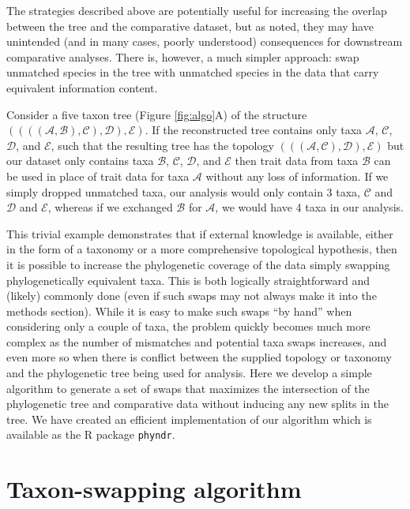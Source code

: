 \documentclass[a4paper,11pt]{article}
\newcommand{\phyndr}{\tt phyndr}
\begin{document}
The strategies described above are potentially useful for increasing the overlap between the tree and the comparative dataset, but as noted, they may have unintended (and in many cases, poorly understood) consequences for downstream comparative analyses. There is, however, a much simpler approach: swap unmatched species in the tree with unmatched species in the data that carry equivalent information content.

Consider a five taxon tree (Figure \ref{fig:algo}A) of the structure $((((\mathcal{A},\mathcal{B}),\mathcal{C}),\mathcal{D}),\mathcal{E})$. If the reconstructed tree contains only taxa $\mathcal{A}$, $\mathcal{C}$, $\mathcal{D}$, and $\mathcal{E}$, such that the resulting tree has the topology $(((\mathcal{A},\mathcal{C}),\mathcal{D}),\mathcal{E})$ but our dataset only contains taxa $\mathcal{B}$, $\mathcal{C}$, $\mathcal{D}$, and $\mathcal{E}$  then trait data from taxa $\mathcal{B}$ can be used in place of trait data for taxa $\mathcal{A}$ without any loss of information. If we simply dropped unmatched taxa, our analysis would only contain 3 taxa, $\mathcal{C}$ and $\mathcal{D}$ and $\mathcal{E}$, whereas if we exchanged $\mathcal{B}$ for $\mathcal{A}$, we would have 4 taxa in our analysis.

This trivial example demonstrates that if external knowledge is available, either in the form of a taxonomy or a more comprehensive topological hypothesis, then it is possible to increase the phylogenetic coverage of the data simply swapping phylogenetically equivalent taxa. This is both logically straightforward and (likely) commonly done (even if such swaps may not always make it into the methods section). While it is easy to make such swaps ``by hand'' when considering only a couple of taxa, the problem quickly becomes much more complex as the number of mismatches and potential taxa swaps increases, and even more so when there is conflict between the supplied topology or taxonomy and the phylogenetic tree being used for analysis. Here we develop a simple algorithm to generate a set of swaps that maximizes the intersection of the phylogenetic tree and comparative data without inducing any new splits in the tree. We have created an efficient implementation of our algorithm which is available as the R package {\phyndr}.

\section{Taxon-swapping algorithm}
\end{document}
